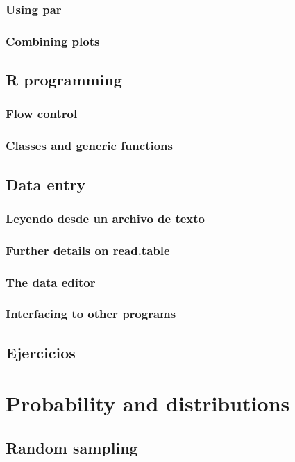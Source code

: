 \documentclass[spanish]{extbook}
\numberwithin{equation}{section}
\numberwithin{figure}{section}
\begin{document}
\subsection{Using par}
\subsection{Combining plots}

\section{R programming}
\subsection{Flow control} \label{flowcontrol}
\subsection{Classes and generic functions}

\section{Data entry}
\subsection{Leyendo desde un archivo de texto} \label{readtextfile}
\subsection{Further details on read.table}
\subsection{The data editor}
\subsection{Interfacing to other programs}
\section{Ejercicios}

\chapter{Probability and distributions}
\section{Random sampling}
\end{document}
